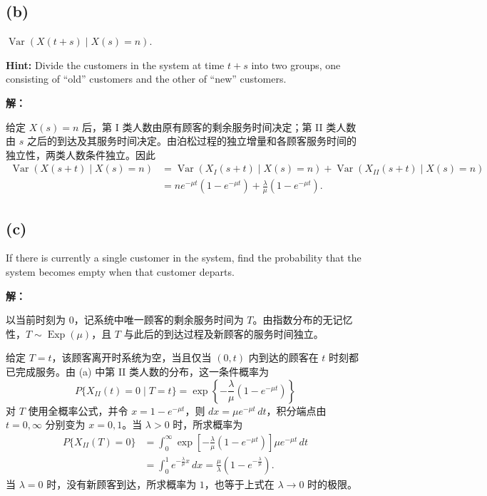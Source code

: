 \documentclass[12pt,a4paper]{article}
\begin{document}
\subsection*{(b)}

$\operatorname{Var}(X(t+s)\mid X(s)=n)$.

\noindent\textbf{Hint:} Divide the customers in the system at time $t+s$ into two groups, one consisting of ``old'' customers and the other of ``new'' customers.

\begin{answerbox}
\textbf{解：}

给定 $X(s)=n$ 后，第 I 类人数由原有顾客的剩余服务时间决定；第 II 类人数由 $s$ 之后的到达及其服务时间决定。由泊松过程的独立增量和各顾客服务时间的独立性，两类人数条件独立。因此
$$
\begin{aligned}
\operatorname{Var}(X(s+t)\mid X(s)=n)
&=\operatorname{Var}(X_I(s+t)\mid X(s)=n)
 +\operatorname{Var}(X_{II}(s+t)\mid X(s)=n)\\
&=ne^{-\mu t}(1-e^{-\mu t})
 +\frac{\lambda}{\mu}(1-e^{-\mu t}).
\end{aligned}
$$

\end{answerbox}

\subsection*{(c)}

If there is currently a single customer in the system, find the probability that the system becomes empty when that customer departs.

\begin{answerbox}
\textbf{解：}

以当前时刻为 $0$，记系统中唯一顾客的剩余服务时间为 $T$。由指数分布的无记忆性，$T\sim\operatorname{Exp}(\mu)$，且 $T$ 与此后的到达过程及新顾客的服务时间独立。

给定 $T=t$，该顾客离开时系统为空，当且仅当 $(0,t)$ 内到达的顾客在 $t$ 时刻都已完成服务。由 (a) 中第 II 类人数的分布，这一条件概率为
$$
P\{X_{II}(t)=0\mid T=t\}
=\exp\left\{-\frac{\lambda}{\mu}(1-e^{-\mu t})\right\}
$$
对 $T$ 使用全概率公式，并令 $x=1-e^{-\mu t}$，则 $dx=\mu e^{-\mu t}\,dt$，积分端点由 $t=0,\infty$ 分别变为 $x=0,1$。当 $\lambda>0$ 时，所求概率为
$$
\begin{aligned}
P\{X_{II}(T)=0\}
&=\int_0^\infty \exp\left[-\frac{\lambda}{\mu}(1-e^{-\mu t})\right]\mu e^{-\mu t}\,dt\\
&=\int_0^1 e^{-\frac{\lambda}{\mu}x}\,dx
=\frac{\mu}{\lambda}\left(1-e^{-\frac{\lambda}{\mu}}\right).
\end{aligned}
$$
当 $\lambda=0$ 时，没有新顾客到达，所求概率为 $1$，也等于上式在 $\lambda\to0$ 时的极限。

\end{answerbox}
\end{document}
